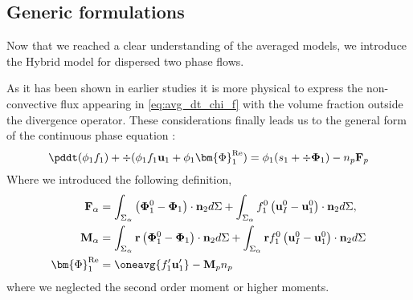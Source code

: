 \Huge{ }\normalsize

\subsection{Generic formulations}

Now that we reached a clear understanding of the averaged models, we introduce the Hybrid model for dispersed two phase flows. 

As it has been shown in earlier studies \citep{jackson2000dynamics,chu2016flux} it is more physical to express the non-convective flux appearing in \ref{eq:avg_dt_chi_f} with the volume fraction outside the divergence operator. 
These considerations finally leads us to the general form of the continuous phase equation : 
\begin{equation}
    \pddt (\phi_1 f_1)
    + \div (\phi_1 f_1\textbf{u}_1
    + \phi_1 \bm{\Phi}^\text{Re}_1)
    = 
    \phi_1(s_1  +\div \mathbf{\Phi}_1)
    - n_p \textbf{F}_p
    \label{eq:hybrid_avg_dt_chif}
\end{equation}
Where we introduced the following definition, 
\begin{align*}
    \textbf{F}_\alpha 
    &= 
    \int_{\Sigma_\alpha}
    \left(
        \mathbf{\Phi}_1^0 
        - \mathbf{\Phi}_1
    \right)  
    \cdot \textbf{n}_2d\Sigma
    + 
    \int_{\Sigma_\alpha}f_1^0
    \left(
        \textbf{u}_I^0
        - \textbf{u}_1^0
    \right)
    \cdot \textbf{n}_2d\Sigma,\\
    \textbf{M}_\alpha 
    &= \int_{\Sigma_\alpha} \textbf{r}
        \left(\mathbf{\Phi}_1^0- \mathbf{\Phi}_1\right)\cdot \textbf{n}_2d\Sigma
        + \int_{\Sigma_\alpha} \textbf{r}f_1^0
        \left(
            \textbf{u}_I^0
            - \textbf{u}_1^0
        \right)
    \cdot \textbf{n}_2d\Sigma\\
    \bm{\Phi}^\text{Re}_1
    &= \oneavg{f_1' \textbf{u}_1'}  - \textbf{M}_p n_p
\end{align*}
where we neglected the second order moment or higher moments. 

